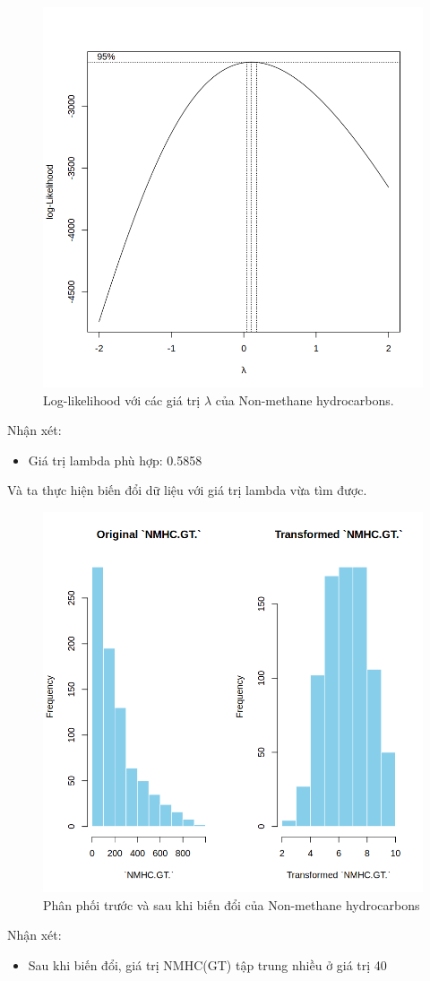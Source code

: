 \begin{figure}[H]
    \centering
    \includegraphics[width=0.75\columnwidth]{air_figures/NMHC(GT)_optimal_lambda.png}
    \caption{Log-likelihood với các giá trị $\lambda$ của Non-methane hydrocarbons.}
    \label{fig:nmhc_optimal_lambda}
\end{figure}
Nhận xét:
\begin{itemize}
    \item Giá trị lambda phù hợp: 0.5858
\end{itemize}

Và ta thực hiện biến đổi dữ liệu với giá trị lambda vừa tìm được.
\begin{figure}[H]
    \centering
    \includegraphics[width=0.75\columnwidth]{air_figures/NMHC(GT)_transformed_distribution.png}
    \caption{Phân phối trước và sau khi biến đổi của Non-methane hydrocarbons}
    \label{fig:nmhc_transformed_distribution}
\end{figure}
Nhận xét:
\begin{itemize}
    \item Sau khi biến đổi, giá trị NMHC(GT) tập trung nhiều ở giá trị 40
\end{itemize}

